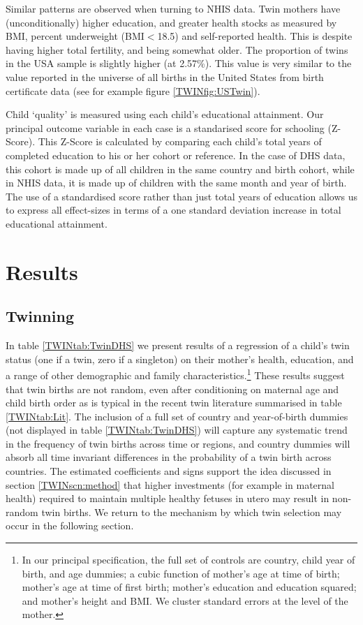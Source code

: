 \documentclass[subeqn]{article}
\begin{document}
\begin{spacing}{1.4}
Similar patterns are observed when turning to NHIS data.  Twin mothers have
(unconditionally) higher education, and greater health stocks as measured by
BMI, percent underweight (BMI$<$18.5) and self-reported health.  This is 
despite having higher total fertility, and being somewhat older.  The 
proportion of twins in the USA sample is slightly higher (at 2.57\%). This
value is very similar to the value reported in the universe of all births in
the United States from birth certificate data (see for example figure 
\ref{TWINfig:USTwin}).

Child `quality' is measured using each child's educational attainment. Our 
principal outcome variable in each case is a standarised score for schooling 
(Z-Score). This Z-Score is calculated by comparing each child's total years of 
completed education to his or her cohort or reference.  In the case of DHS data,
this cohort is made up of all children in the same country and birth cohort, 
while in NHIS data, it is made up of children with the same month and year of 
birth. The use of a standardised score rather than just total years of education
allows us to express all effect-sizes in terms of a one standard deviation 
increase in total educational attainment.

\section{Results}                                  \label{TWINscn:results}
\subsection{Twinning}                              \label{TWINsscn:twinning}
In table \ref{TWINtab:TwinDHS} we present results of a regression of a child's 
twin status (one if a twin, zero if a singleton) on their mother's health, 
education, and a range of other demographic and family characteristics.\footnote{
In our principal specification, the full set of controls are country, child year 
of birth, and age dummies; a cubic function of mother's age at time of birth; 
mother's age at time of first birth; mother's education and education squared; 
and mother's height and BMI. We cluster standard errors at the level of the 
mother.}  These results suggest that twin births are not random, even after 
conditioning on maternal age and child birth order as is typical in the recent 
twin literature summarised in table \ref{TWINtab:Lit}. The inclusion of a full 
set of country and year-of-birth dummies (not displayed in table 
\ref{TWINtab:TwinDHS}) will capture any systematic trend in the frequency of 
twin births across time or regions, and country dummies will absorb all time 
invariant differences in the probability of a twin birth across countries. The 
estimated coefficients and signs support the idea discussed in section 
\ref{TWINscn:method} that higher investments (for example in maternal health) 
required to maintain multiple healthy fetuses in utero may result in non-random 
twin births. We return to the mechanism by which twin selection may occur in 
the following section.


\end{spacing}
\end{document}
